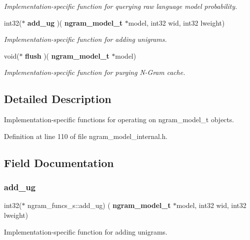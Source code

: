 \begin{DoxyCompactItemize}
\begin{DoxyCompactList}\small\item\em Implementation-\/specific function for querying raw language model probability. \end{DoxyCompactList}\item 
int32($\ast$ \textbf{ add\+\_\+ug} )(\textbf{ ngram\+\_\+model\+\_\+t} $\ast$model, int32 wid, int32 lweight)
\begin{DoxyCompactList}\small\item\em Implementation-\/specific function for adding unigrams. \end{DoxyCompactList}\item 
\mbox{\label{structngram__funcs__s_af1ab9c61d3b9fa4a4782b8df3089baa6}} 
void($\ast$ \textbf{ flush} )(\textbf{ ngram\+\_\+model\+\_\+t} $\ast$model)
\begin{DoxyCompactList}\small\item\em Implementation-\/specific function for purging N-\/\+Gram cache. \end{DoxyCompactList}\end{DoxyCompactItemize}


\subsection{Detailed Description}
Implementation-\/specific functions for operating on ngram\+\_\+model\+\_\+t objects. 

Definition at line 110 of file ngram\+\_\+model\+\_\+internal.\+h.



\subsection{Field Documentation}
\mbox{\label{structngram__funcs__s_aec7921e64c7cc778fa2267d6717482c3}} 
\subsubsection{add\+\_\+ug}
{\footnotesize\ttfamily int32($\ast$ ngram\+\_\+funcs\+\_\+s\+::add\+\_\+ug) (\textbf{ ngram\+\_\+model\+\_\+t} $\ast$model, int32 wid, int32 lweight)}



Implementation-\/specific function for adding unigrams. 

